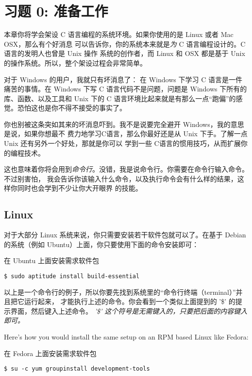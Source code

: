 \chapter{习题 0: 准备工作}

本章你将学会架设 C 语言编程的系统环境。如果你使用的是 Linux 或者 Mac OSX，那么有个好消息
可以告诉你，你的系统本来就是\emph{为} C 语言编程设计的。C 语言的发明人也曾是 Unix 操作
系统的创作者，而 Linux 和 OSX 都是基于 Unix 的操作系统。所以，整个架设过程会非常简单。

对于 Windows 的用户，我就只有坏消息了： 在 Windows 下学习 C 语言是一件痛苦的事情。在 
Windows 下写 C 语言代码不是问题，问题是 Windows 下所有的库、函数、以及工具和 Unix 下的
C 语言环境比起来就是有那么一点“跑偏”的感觉。恐怕这也是你不得不接受的事实了。

你也别被这条突如其来的坏消息吓到。我不是说要完全避开 Windows，我的意思是说，如果你想最不
费力地学习C语言，那么你最好还是从 Unix 下手。了解一点 Unix 还有另外一个好处，那就是你可以
学到一些 C语言的惯用技巧，从而扩展你的编程技术。

这也意味着你将会用到\emph{命令行}。没错，我是说命令行。你需要在命令行输入命令。不过别害怕，
我会告诉你该输入什么命令，以及执行命令会有什么样的结果，这样你同时也会学到不少让你大开眼界
的技能。

\section{Linux}

对于大部分 Linux 系统来说，你只需要安装若干软件包就可以了。在基于 Debian 的系统（例如 
Ubuntu）上面，你只要使用下面的命令安装即可：

\begin{code}{在 Ubuntu 上面安装需求软件包}
\begin{lstlisting}
$ sudo aptitude install build-essential
\end{lstlisting}
\end{code}

以上是一个命令行的例子，所以你要先找到系统里的“命令行终端（terminal）”并且把它运行起来，
才能执行上述的命令。你会看到一个类似上面提到的 '\$' 的提示界面，然后键入上述命令。\emph{
'\$' 这个符号是无需键入的，只要把后面的内容键入即可。}

Here's how you would install the same setup on an RPM based Linux
like Fedora:

\begin{code}{在 Fedora 上面安装需求软件包}
\begin{lstlisting}
$ su -c yum groupinstall development-tools
\end{lstlisting}
\end{code}

